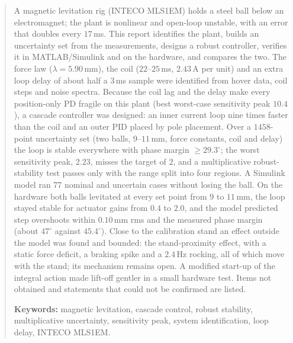 \documentclass[11pt,a4paper]{article}
\begin{document}
\begin{abstract}
A magnetic levitation rig (INTECO MLS1EM) holds a steel ball below an electromagnet; the plant is nonlinear and open-loop
unstable, with an error that doubles every $17$\,ms. This report identifies the plant, builds an uncertainty set from the
measurements, designs a robust controller, verifies it in MATLAB/Simulink and on the hardware, and compares the two. The force law
($\lambda = 5.90$\,mm), the coil ($22$--$25$\,ms, $2.43$\,A per unit) and an extra loop delay of about half a $3$\,ms sample were
identified from hover data, coil steps and noise spectra. Because the coil lag and the delay make every position-only PD fragile
on this plant (best worst-case sensitivity peak $10.4$), a cascade controller was designed: an inner current loop nine times faster
than the coil and an outer PID placed by pole placement. Over a $1458$-point uncertainty set (two balls, $9$--$11$\,mm, force
constants, coil and delay) the loop is stable everywhere with phase margin $\ge 29.3^\circ$; the worst sensitivity peak, $2.23$,
misses the target of $2$, and a multiplicative robust-stability test passes only with the range split into four regions. A Simulink
model ran 77 nominal and uncertain cases without losing the ball. On the hardware both balls levitated at every set point from $9$
to $11$\,mm, the loop stayed stable for actuator gains from $0.4$ to $2.0$, and the model predicted step overshoots within
$0.10$\,mm rms and the measured phase margin (about $47^\circ$ against $45.4^\circ$). Close to the calibration stand an effect
outside the model was found and bounded: the stand-proximity effect, with a static force deficit, a braking spike and a $2.4$\,Hz
rocking, all of which move with the stand; its mechanism remains open. A modified start-up of the integral action made lift-off
gentler in a small hardware test. Items not obtained and statements that could not be confirmed are listed.

\medskip
\noindent\textbf{Keywords:} magnetic levitation, cascade control, robust stability, multiplicative uncertainty,
sensitivity peak, system identification, loop delay, INTECO MLS1EM.
\end{abstract}

\tableofcontents
\listoffigures
\listoftables
\clearpage
{}

\end{document}

